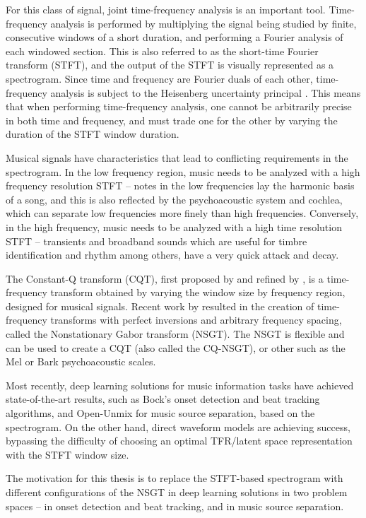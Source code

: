 \documentclass[letter,12pt,notitlepage]{article}
\begin{document}
For this class of signal, joint time-frequency analysis is an important tool. Time-frequency analysis is performed by multiplying the signal being studied by finite, consecutive windows of a short duration, and performing a Fourier analysis of each windowed section. This is also referred to as the short-time Fourier transform (STFT), and the output of the STFT is visually represented as a spectrogram. Since time and frequency are Fourier duals of each other, time-frequency analysis is subject to the Heisenberg uncertainty principal . This means that when performing time-frequency analysis, one cannot be arbitrarily precise in both time and frequency, and must trade one for the other by varying the duration of the STFT window duration.

Musical signals have characteristics that lead to conflicting requirements in the spectrogram. In the low frequency region, music needs to be analyzed with a high frequency resolution STFT -- notes in the low frequencies lay the harmonic basis of a song, and this is also reflected by the psychoacoustic system and cochlea, which can separate low frequencies more finely than high frequencies. Conversely, in the high frequency, music needs to be analyzed with a high time resolution STFT -- transients and broadband sounds which are useful for timbre identification and rhythm among others, have a very quick attack and decay.

The Constant-Q transform (CQT), first proposed by \textcite{jbrown} and refined by \textcite{klapuricqt}, is a time-frequency transform obtained by varying the window size by frequency region, designed for musical signals. Recent work by \textcite{balazs} resulted in the creation of time-frequency transforms with perfect inversions and arbitrary frequency spacing, called the Nonstationary Gabor transform (NSGT). The NSGT is flexible and can be used to create a CQT (also called the CQ-NSGT), or other such as the Mel or Bark psychoacoustic scales.

Most recently, deep learning solutions for music information tasks have achieved state-of-the-art results, such as Bock's onset detection and beat tracking algorithms, and Open-Unmix for music source separation, based on the spectrogram. On the other hand, direct waveform models are achieving success, bypassing the difficulty of choosing an optimal TFR/latent space representation with the STFT window size.

The motivation for this thesis is to replace the STFT-based spectrogram with different configurations of the NSGT in deep learning solutions in two problem spaces -- in onset detection and beat tracking, and in music source separation.
\end{document}

